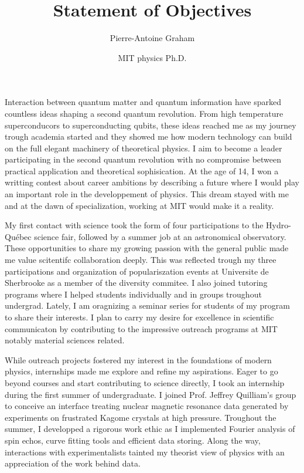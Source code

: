 \documentclass[12pt]{article}
\title{Statement of Objectives}
\author{Pierre-Antoine Graham}
\date{MIT physics Ph.D.}
\begin{document}
\maketitle
\vspace{0.5cm}

Interaction between quantum matter and quantum information have sparked countless ideas shaping a second quantum revolution. From high temperature superconducors to superconducting qubits, these ideas reached me as my journey trough academia started and they showed me how modern technology can build on the full elegant machinery of theoretical physics. I aim to become a leader participating in the second quantum revolution with no compromise between practical application and theoretical sophisication. At the age of 14, I won a writting contest about career ambitions by describing a future where I would play an important role in the developpement of physics. This dream stayed with me and at the dawn of specialization, working at MIT would make it a reality. \vspace{0.4cm}

My first contact with science took the form of four participations to the Hydro-Québec science fair, followed by a summer job at an astronomical observatory. These opportunities to share my growing passion with the general public made me value scitentifc collaboration deeply. This was reflected trough my three participations and organization of populariszation events at Universite de Sherbrooke as a member of the diversity commitee. I also joined tutoring programs where I helped students individually and in groups troughout undergrad. Lately, I am oragnizing a seminar series for students of my program to share their interests. I plan to carry my desire for excellence in scientific communicaton by contributing to the impressive outreach programs at MIT notably material sciences related. \vspace{0.4cm} 

While outreach projects fostered my interest in the foundations of modern physics, internships made me explore and refine my aspirations. Eager to go beyond courses and start contributing to science directly, I took an internship during the first summer of undergraduate. I joined Prof. Jeffrey Quilliam's group to conceive an interface treating nuclear magnetic resonance data generated by experiments on frustrated Kagome crystals at high pressure. Troughout the summer, I developped a rigorous work ethic as I implemented Fourier analysis of spin echos, curve fitting tools and efficient data storing. Along the way, interactions with experimentalists tainted my theorist view of physics with an appreciation of the work behind data. \vspace{0.4cm}
\end{document}
